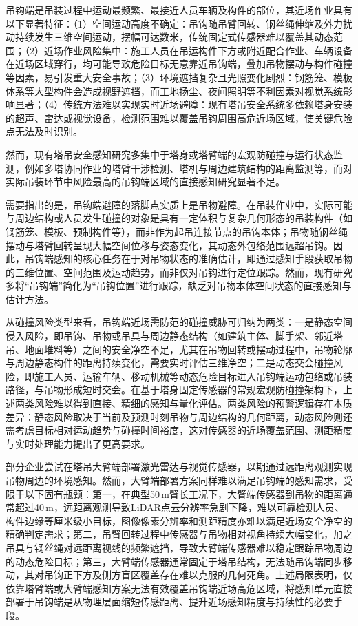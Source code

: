 吊钩端是吊装过程中运动最频繁、最接近人员车辆及构件的部位，其近场作业具有以下显著特征：（1）空间运动高度不确定：吊钩随吊臂回转、钢丝绳伸缩及外力扰动持续发生三维空间运动，摆幅可达数米，传统固定式传感器难以覆盖其动态范围；（2）近场作业风险集中：施工人员在吊运构件下方或附近配合作业、车辆设备在近场区域穿行，均可能导致危险目标无意靠近吊钩端，叠加吊物摆动与构件碰撞等因素，易引发重大安全事故；（3）环境遮挡复杂且光照变化剧烈：钢筋笼、模板体系等大型构件会造成视野遮挡，而工地扬尘、夜间照明等不利因素对视觉系统影响显著；（4）传统方法难以实现实时近场避障：现有塔吊安全系统多依赖塔身安装的超声、雷达或视觉设备，检测范围难以覆盖吊钩周围高危近场区域，使关键危险点无法及时识别。

然而，现有塔吊安全感知研究多集中于塔身或塔臂端的宏观防碰撞与运行状态监测，例如多塔协同作业的塔臂干涉检测、塔机与周边建筑结构的距离监测等，而对实际吊装环节中风险最高的吊钩端区域的直接感知研究显著不足\cite{9LK3VTEQ,4}。

需要指出的是，吊钩端避障的落脚点实质上是吊物避障。在吊装作业中，实际可能与周边结构或人员发生碰撞的对象是具有一定体积与复杂几何形态的吊装构件（如钢筋笼、模板、预制构件等），而非作为起吊连接节点的吊钩本体；吊物随钢丝绳摆动与塔臂回转呈现大幅空间位移与姿态变化，其动态外包络范围远超吊钩。因此，吊钩端感知的核心任务在于对吊物状态的准确估计，即通过感知手段获取吊物的三维位置、空间范围及运动趋势，而非仅对吊钩进行定位跟踪。然而，现有研究多将“吊钩端”简化为“吊钩位置”进行跟踪，缺乏对吊物本体空间状态的直接感知与估计方法。

从碰撞风险类型来看，吊钩端近场需防范的碰撞威胁可归纳为两类：一是静态空间侵入风险，即吊钩、吊物或吊具与周边静态结构（如建筑主体、脚手架、邻近塔吊、地面堆料等）之间的安全净空不足，尤其在吊物回转或摆动过程中，吊物轮廓与周边静态构件的距离持续变化，需要实时评估三维净空；二是动态交会碰撞风险，即施工人员、运输车辆、移动机械等动态危险目标进入吊钩端运动包络或吊装路径，与吊物形成短时交会\cite{8,10}。在基于塔身固定传感器的常规宏观防碰撞架构下，上述两类风险难以得到直接、精细的感知与量化评估。两类风险的预警逻辑存在本质差异：静态风险取决于当前及预测时刻吊物与周边结构的几何距离，动态风险则还需考虑目标相对运动趋势与碰撞时间裕度，这对传感器的近场覆盖范围、测距精度与实时处理能力提出了更高要求。

部分企业尝试在塔吊大臂端部署激光雷达与视觉传感器\cite{2,7}，以期通过远距离观测实现吊物周边的环境感知。然而，大臂端部署方案同样难以满足吊钩端的感知需求，受限于以下固有瓶颈：第一，在典型50\,m臂长工况下，大臂端传感器到吊物的距离通常超过40\,m，远距离观测导致LiDAR点云分辨率急剧下降，难以可靠检测人员、构件边缘等厘米级小目标，图像像素分辨率和测距精度亦难以满足近场安全净空的精确判定需求；第二，吊臂回转过程中传感器与吊物相对视角持续大幅变化，加之吊具与钢丝绳对远距离视线的频繁遮挡，导致大臂端传感器难以稳定跟踪吊物周边的动态危险目标；第三，大臂端传感器通常固定于塔吊结构，无法随吊钩端同步移动，其对吊钩正下方及侧方盲区覆盖存在难以克服的几何死角。上述局限表明，仅依靠塔臂端或大臂端感知方案无法有效覆盖吊钩端近场高危区域，将感知单元直接部署于吊钩端是从物理层面缩短传感距离、提升近场感知精度与持续性的必要手段。

